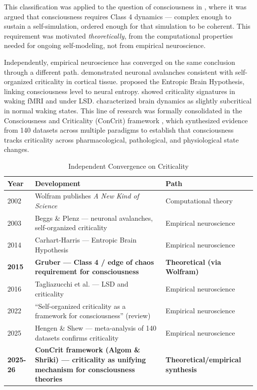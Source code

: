 \documentclass[12pt]{article}
\begin{document}
This classification was applied to the question of consciousness in \citet{Gruber2015}, where it was argued that consciousness requires Class 4 dynamics --- complex enough to sustain a self-simulation, ordered enough for that simulation to be coherent. This requirement was motivated \emph{theoretically}, from the computational properties needed for ongoing self-modeling, not from empirical neuroscience.

Independently, empirical neuroscience has converged on the same conclusion through a different path. \citet{Beggs2003} demonstrated neuronal avalanches consistent with self-organized criticality in cortical tissue. \citet{CarhartHarris2014} proposed the Entropic Brain Hypothesis, linking consciousness level to neural entropy. \citet{Tagliazucchi2012,Tagliazucchi2016} showed criticality signatures in waking fMRI and under LSD. \citet{Priesemann2013,Priesemann2014} characterized brain dynamics as slightly subcritical in normal waking states. This line of research was formally consolidated in the Consciousness and Criticality (ConCrit) framework \citep{AlgomShriki2026}, which synthesized evidence from 140 datasets across multiple paradigms to establish that consciousness tracks criticality across pharmacological, pathological, and physiological state changes.

\begin{table}[htbp]
\caption{Independent Convergence on Criticality}
\centering
\small
\begin{tabularx}{\textwidth}{lXl}
\toprule
\textbf{Year} & \textbf{Development} & \textbf{Path} \\
\midrule
2002 & Wolfram publishes \emph{A New Kind of Science} & Computational theory \\
2003 & Beggs \& Plenz --- neuronal avalanches, self-organized criticality & Empirical neuroscience \\
2014 & Carhart-Harris --- Entropic Brain Hypothesis & Empirical neuroscience \\
\textbf{2015} & \textbf{Gruber --- Class 4 / edge of chaos requirement for consciousness} & \textbf{Theoretical (via Wolfram)} \\
2016 & Tagliazucchi et al. --- LSD and criticality & Empirical neuroscience \\
2022 & ``Self-organized criticality as a framework for consciousness'' (review) & Empirical neuroscience \\
2025 & Hengen \& Shew --- meta-analysis of 140 datasets confirms criticality & Empirical neuroscience \\
\textbf{2025-26} & \textbf{ConCrit framework (Algom \& Shriki) --- criticality as unifying mechanism for consciousness theories} & \textbf{Theoretical/empirical synthesis} \\
\bottomrule
\end{tabularx}
\end{table}
\end{document}
